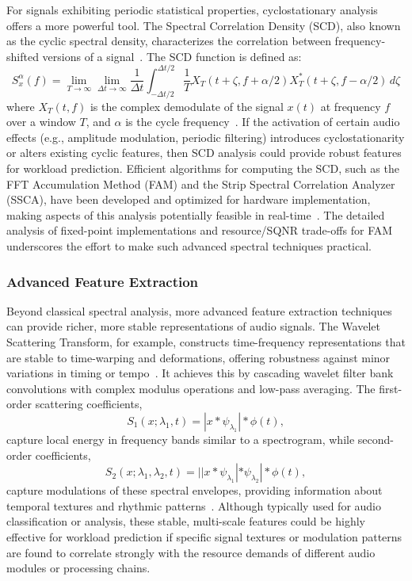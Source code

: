 For signals exhibiting periodic statistical properties, cyclostationary analysis offers a more powerful tool. The Spectral Correlation Density (SCD), also known as the cyclic spectral density, characterizes the correlation between frequency-shifted versions of a signal~\cite{ref1}. The SCD function is defined as:
\[
S_x^\alpha(f) = \lim_{T\to\infty} \lim_{\Delta t\to\infty} \frac{1}{\Delta t} \int_{-\Delta t/2}^{\Delta t/2} \frac{1}{T} X_T(t+\zeta, f+\alpha/2) X_T^*(t+\zeta, f-\alpha/2) \, d\zeta
\]
where $X_T(t,f)$ is the complex demodulate of the signal $x(t)$ at frequency $f$ over a window $T$, and $\alpha$ is the cycle frequency~\cite{ref1}. If the activation of certain audio effects (e.g., amplitude modulation, periodic filtering) introduces cyclostationarity or alters existing cyclic features, then SCD analysis could provide robust features for workload prediction. Efficient algorithms for computing the SCD, such as the FFT Accumulation Method (FAM) and the Strip Spectral Correlation Analyzer (SSCA), have been developed and optimized for hardware implementation, making aspects of this analysis potentially feasible in real-time~\cite{ref1}. The detailed analysis of fixed-point implementations and resource/SQNR trade-offs for FAM~\cite{ref12} underscores the effort to make such advanced spectral techniques practical.

\subsubsection{Advanced Feature Extraction}
Beyond classical spectral analysis, more advanced feature extraction techniques can provide richer, more stable representations of audio signals. The Wavelet Scattering Transform, for example, constructs time-frequency representations that are stable to time-warping and deformations, offering robustness against minor variations in timing or tempo~\cite{ref13}. It achieves this by cascading wavelet filter bank convolutions with complex modulus operations and low-pass averaging. The first-order scattering coefficients,
\[
S_1(x; \lambda_1, t) = |x * \psi_{\lambda_1}| * \phi(t),
\]
capture local energy in frequency bands similar to a spectrogram, while second-order coefficients,
\[
S_2(x; \lambda_1, \lambda_2, t) = ||x * \psi_{\lambda_1}| * \psi_{\lambda_2}| * \phi(t),
\]
capture modulations of these spectral envelopes, providing information about temporal textures and rhythmic patterns~\cite{ref13}. Although typically used for audio classification or analysis, these stable, multi-scale features could be highly effective for workload prediction if specific signal textures or modulation patterns are found to correlate strongly with the resource demands of different audio modules or processing chains.

